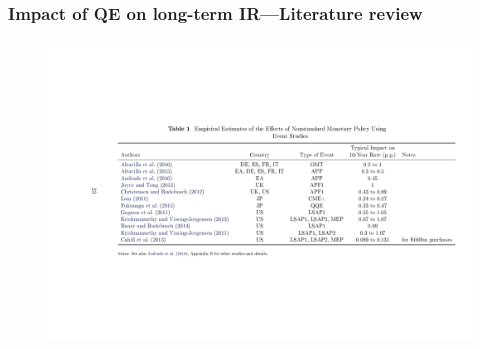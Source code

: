 \documentclass[pdflatex,aspectratio=169]{beamer}
\begin{document}
\begin{frame}\frametitle{\bf Impact of QE on long-term IR---Literature review}
\begin{figure}
\begin{center}
\includegraphics[width=1\textwidth]{./figures/fLitRevAPPsize}
\end{center}
\end{figure}

\end{frame}
\end{document}
